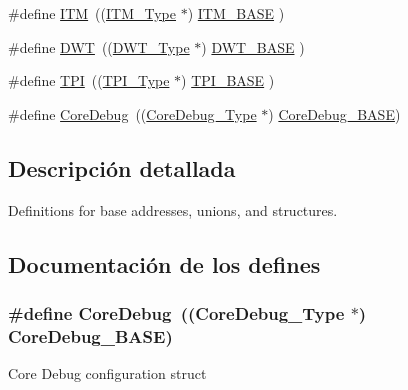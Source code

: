 \begin{DoxyCompactItemize}
\item 
\#define \hyperlink{group___c_m_s_i_s__core__base_gabae7cdf882def602cb787bb039ff6a43}{I\+TM}~((\hyperlink{struct_i_t_m___type}{I\+T\+M\+\_\+\+Type}       $\ast$)     \hyperlink{group___c_m_s_i_s__core__base_gadd76251e412a195ec0a8f47227a8359e}{I\+T\+M\+\_\+\+B\+A\+SE}      )
\item 
\#define \hyperlink{group___c_m_s_i_s__core__base_gabbe5a060185e1d5afa3f85b14e10a6ce}{D\+WT}~((\hyperlink{struct_d_w_t___type}{D\+W\+T\+\_\+\+Type}       $\ast$)     \hyperlink{group___c_m_s_i_s__core__base_gafdab534f961bf8935eb456cb7700dcd2}{D\+W\+T\+\_\+\+B\+A\+SE}      )
\item 
\#define \hyperlink{group___c_m_s_i_s__core__base_ga8b4dd00016aed25a0ea54e9a9acd1239}{T\+PI}~((\hyperlink{struct_t_p_i___type}{T\+P\+I\+\_\+\+Type}       $\ast$)     \hyperlink{group___c_m_s_i_s__core__base_ga2b1eeff850a7e418844ca847145a1a68}{T\+P\+I\+\_\+\+B\+A\+SE}      )
\item 
\#define \hyperlink{group___c_m_s_i_s__core__base_gab6e30a2b802d9021619dbb0be7f5d63d}{Core\+Debug}~((\hyperlink{struct_core_debug___type}{Core\+Debug\+\_\+\+Type} $\ast$)     \hyperlink{group___c_m_s_i_s__core__base_ga680604dbcda9e9b31a1639fcffe5230b}{Core\+Debug\+\_\+\+B\+A\+SE})
\end{DoxyCompactItemize}


\subsection{Descripción detallada}
Definitions for base addresses, unions, and structures. 



\subsection{Documentación de los \textquotesingle{}defines\textquotesingle{}}
\subsubsection[{\texorpdfstring{Core\+Debug}{CoreDebug}}]{\setlength{\rightskip}{0pt plus 5cm}\#define Core\+Debug~(({\bf Core\+Debug\+\_\+\+Type} $\ast$)     {\bf Core\+Debug\+\_\+\+B\+A\+SE})}\hypertarget{group___c_m_s_i_s__core__base_gab6e30a2b802d9021619dbb0be7f5d63d}{}\label{group___c_m_s_i_s__core__base_gab6e30a2b802d9021619dbb0be7f5d63d}
Core Debug configuration struct 

